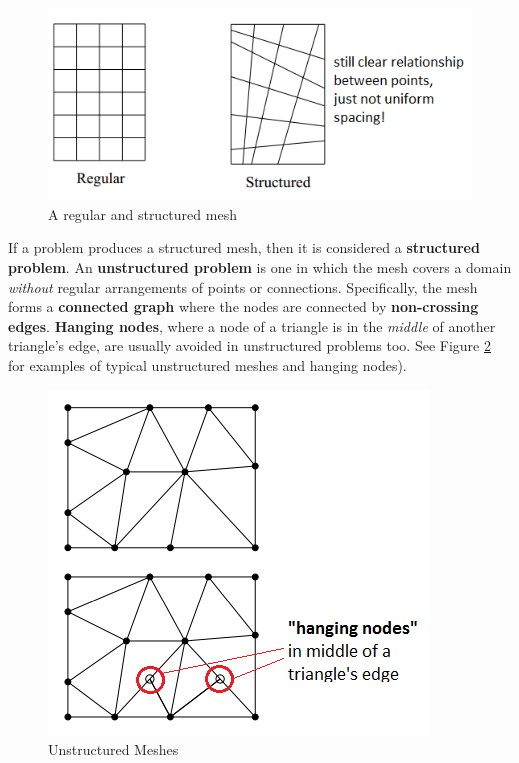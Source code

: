 \documentclass{article}
\begin{document}
\begin{figure}
	\centering
	\includegraphics[scale=0.6]{figures/regular-structured-mesh.png}
	\caption{A regular and structured mesh}
	\label{fig:regular-structured-meshes}
\end{figure}

If a problem produces a structured mesh, then it is considered a \textbf{structured problem}. An \textbf{unstructured problem} is one in which the mesh covers a domain \textit{without} regular arrangements of points or connections. Specifically, the mesh forms a \textbf{connected graph} where the nodes are connected by \textbf{non-crossing edges}. \textbf{Hanging nodes}, where a node of a triangle is in the \textit{middle} of another triangle's edge, are usually avoided in unstructured problems too. See Figure \ref{fig:unstructured-meshes} for examples of typical unstructured meshes and hanging nodes).

\begin{figure}
	\centering
	\includegraphics[scale=0.5]{figures/unstructured-mesh-examples.png}
	\caption{Unstructured Meshes}
	\label{fig:unstructured-meshes}
\end{figure}
\end{document}
